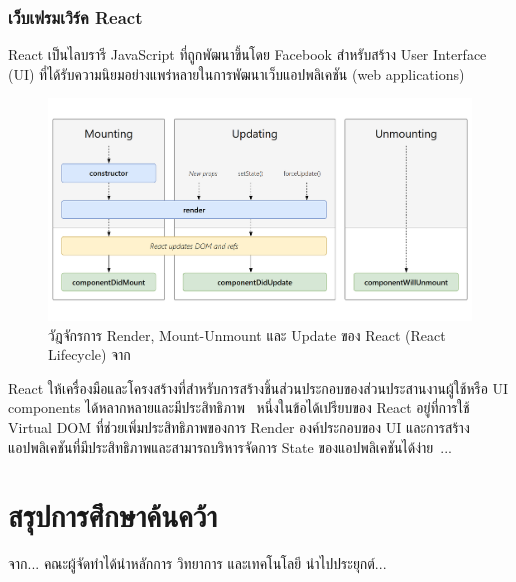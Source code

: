 \documentclass[12pt,one side,openright,a4paper]{cpe-thesis-th}
\newcommand{\thaijustify}[1]{%
  \par\hspace{30pt}\justifying
  #1
}
\begin{document}
        \subsubsection{เว็บเฟรมเวิร์ค React}
            \thaijustify{
                React เป็นไลบรารี JavaScript ที่ถูกพัฒนาขึ้นโดย Facebook สำหรับสร้าง User Interface (UI) ที่ได้รับความนิยมอย่างแพร่หลายในการพัฒนาเว็บแอปพลิเคชัน (web applications)~\cite{flanagan20js}
            }
            \begin{figure}[H]
                \centering
                \includegraphics[width=12cm]{figure/literature/react-lifecycle.png}
                \caption[วัฏจักรการทำงานของ React]{วัฎจักรการ Render, Mount-Unmount และ Update ของ React (React Lifecycle) จาก~\cite{reactcycles}}\label{fig:lit-react}
            \end{figure}
            \thaijustify{
                React ให้เครื่องมือและโครงสร้างที่สำหรับการสร้างชิ้นส่วนประกอบของส่วนประสานงานผู้ใช้หรือ UI components ได้หลากหลายและมีประสิทธิภาพ~\cite{crockford08js} หนึ่งในข้อได้เปรียบของ React อยู่ที่การใช้ Virtual DOM ที่ช่วยเพิ่มประสิทธิภาพของการ Render องค์ประกอบของ UI และการสร้างแอปพลิเคชันที่มีประสิทธิภาพและสามารถบริหารจัดการ State ของแอปพลิเคชันได้ง่าย~\cite{flanagan20js}...
            }
\section{สรุปการศึกษาค้นคว้า}
    \thaijustify{
        จาก... คณะผู้จัดทำได้นำหลักการ วิทยาการ และเทคโนโลยี นำไปประยุกต์...
    }
\end{document}
